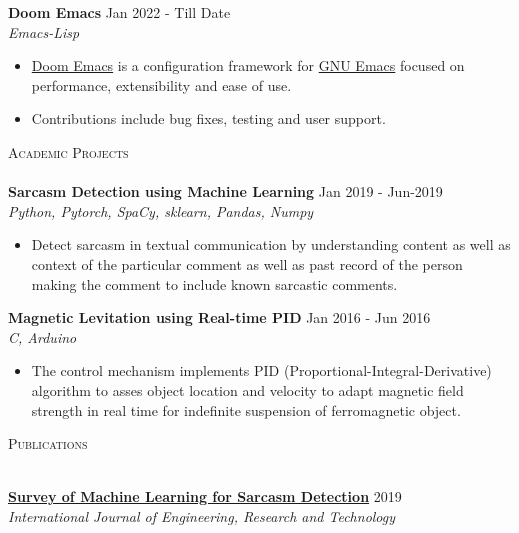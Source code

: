 \documentclass[a4paper]{article}
\newcommand{\lineunder} {
    \vspace*{-8pt} \\
    \hspace*{-18pt} \hrulefill \\
}
\newcommand{\header} [1] {
    {\hspace*{-18pt}\vspace*{6pt} \textsc{#1}}
    \vspace*{-6pt} \lineunder
}
\begin{document}
{\textbf{Doom Emacs}} \hfill Jan 2022 - Till Date \\
\textit{Emacs-Lisp} \\
\begin{itemize}
  \item \href{https://github.com/doomemacs/doomemacs}{Doom Emacs} is a configuration framework for \href{https://www.gnu.org/software/emacs/}{GNU Emacs} focused on performance, extensibility and ease of use. \\
  \item Contributions include bug fixes, testing and user support.\\
\end{itemize}

\header{Academic Projects}
\vspace{1mm}
{\textbf{Sarcasm Detection using Machine Learning}} \hfill Jan 2019 - Jun-2019\\
\textit{Python, Pytorch, SpaCy, sklearn, Pandas, Numpy} \\
\begin{itemize}
  \item Detect sarcasm in textual communication by understanding content as well as context of the particular comment as well as past record of the person making the comment to include known sarcastic comments.\\
\end{itemize}

{\textbf{Magnetic Levitation using Real-time PID}} \hfill Jan 2016 - Jun 2016\\
\textit{C, Arduino} \\
\begin{itemize}
  \item The control mechanism implements PID (Proportional-Integral-Derivative) algorithm to asses object location and velocity to adapt magnetic field strength in real time for indefinite suspension of ferromagnetic object.\\
\end{itemize}
\vspace*{2mm}

\header{Publications}
\vspace{1mm}

{\textbf{\href{https://www.ijert.org/survey-of-machine-learning-for-sarcasm-detection}{Survey of Machine Learning for Sarcasm Detection}}} \hfill 2019\\
\textit{International Journal of Engineering, Research and Technology} \\
\vspace*{2mm}
\end{document}
